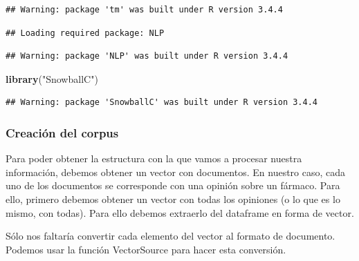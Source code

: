 \documentclass[spanish,]{article}
\newenvironment{Shaded}{\begin{snugshade}}{\end{snugshade}}
\newcommand{\KeywordTok}[1]{\textcolor[rgb]{0.13,0.29,0.53}{\textbf{#1}}}
\newcommand{\StringTok}[1]{\textcolor[rgb]{0.31,0.60,0.02}{#1}}
\newcommand{\CommentTok}[1]{\textcolor[rgb]{0.56,0.35,0.01}{\textit{#1}}}
\newcommand{\OperatorTok}[1]{\textcolor[rgb]{0.81,0.36,0.00}{\textbf{#1}}}
\newcommand{\NormalTok}[1]{#1}
\begin{document}
\begin{verbatim}
## Warning: package 'tm' was built under R version 3.4.4
\end{verbatim}

\begin{verbatim}
## Loading required package: NLP
\end{verbatim}

\begin{verbatim}
## Warning: package 'NLP' was built under R version 3.4.4
\end{verbatim}

\begin{Shaded}
\begin{Highlighting}[]
\KeywordTok{library}\NormalTok{(}\StringTok{"SnowballC"}\NormalTok{)}
\end{Highlighting}
\end{Shaded}

\begin{verbatim}
## Warning: package 'SnowballC' was built under R version 3.4.4
\end{verbatim}

\subsubsection{Creación del corpus}\label{creacion-del-corpus}

Para poder obtener la estructura con la que vamos a procesar nuestra
información, debemos obtener un vector con documentos. En nuestro caso,
cada uno de los documentos se corresponde con una opinión sobre un
fármaco. Para ello, primero debemos obtener un vector con todas los
opiniones (o lo que es lo mismo, con todas). Para ello debemos extraerlo
del dataframe en forma de vector.

Sólo nos faltaría convertir cada elemento del vector al formato de
documento. Podemos usar la función VectorSource para hacer esta
conversión.

\begin{Shaded}
\end{Shaded}
\end{document}
